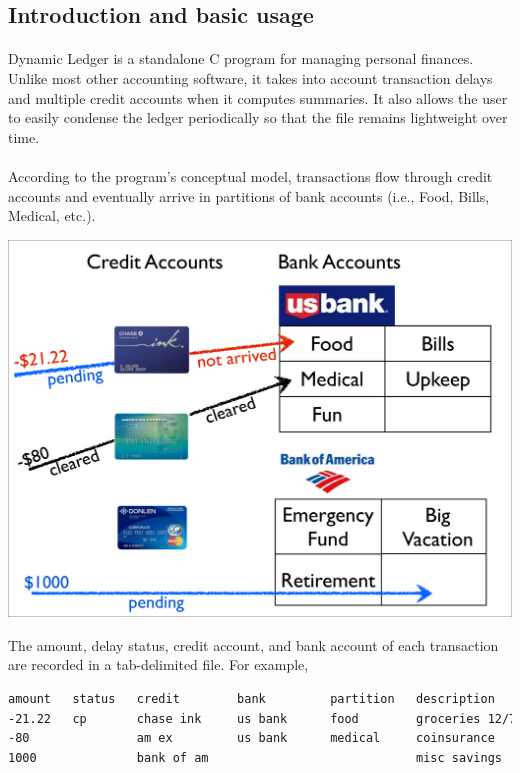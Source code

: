 \documentclass{article}
\providecommand{\q}{$\quad$ \newline}
\begin{document}
\begin{flushleft}

\section{Introduction and basic usage}

\paragraph{} Dynamic Ledger is a standalone C program for managing personal finances. Unlike most other accounting software, it takes into account transaction delays and multiple credit accounts when it computes summaries. It also allows the user to easily condense the ledger periodically so that the file remains lightweight over time.

\paragraph{} According to the program's conceptual model, transactions flow through credit accounts and eventually arrive in partitions of bank accounts (i.e., Food, Bills, Medical, etc.). \q

\begin{center}
\includegraphics[scale=.4]{fig/model}
\end{center}

The amount, delay status, credit account, and bank account of each transaction are recorded in a tab-delimited file. For example, 

\begin{lstlisting}[language=bash, title=example\_ledger1.txt]
amount   status   credit        bank         partition   description
-21.22   cp       chase ink     us bank      food        groceries 12/7/13
-80               am ex         us bank      medical     coinsurance 
1000              bank of am                             misc savings
\end{lstlisting}  \q


\end{flushleft}
\end{document}
